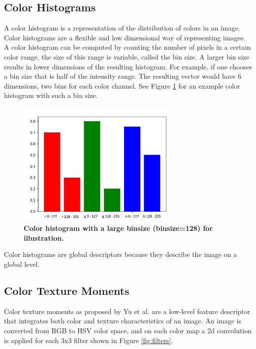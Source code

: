 \documentclass{article}
\begin{document}
\subsection{Color Histograms}
A color histogram is a representation of the distribution of colors in an image. Color histograms are a flexible and low dimensional way of representing images. A color histogram can be computed by counting the number of pixels in a certain color range, the size of this range is variable, called the bin size. A larger bin size results in lower dimensions of the resulting histogram. For example, if one chooses a bin size that is half of the intensity range. The resulting vector would have 6 dimensions, two bins for each color channel. See Figure \ref{fig:colorhistogram} for an example color histogram with such a bin size.
\begin{figure}[H]
	\includegraphics[width=8cm]{images/colorhistogram.png}
	\centering
	\caption{\textbf{Color histogram with a large binsize (binsize=128) for illustration.}}
	\label{fig:colorhistogram}
\end{figure}
Color histograms are global descriptors because they describe the image on a global level.

\subsection{Color Texture Moments}
Color texture moments as proposed by Yu et al. \cite{yu2002colortexturemoments} are a low-level feature descriptor that integrates both color and texture characteristics of an image. An image is converted from RGB to HSV color space, and on each color map a 2d convolution is applied for each 3x3 filter shown in Figure \ref{fig:filters}.
\end{document}
